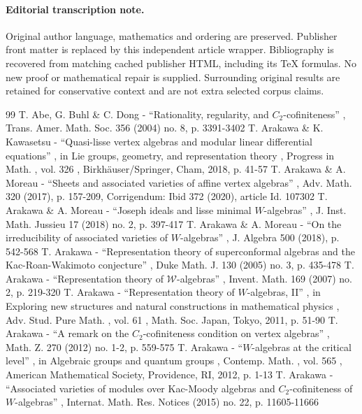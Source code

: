 \documentclass[11pt]{article}
\numberwithin{equation}{section}
\begin{document}
\paragraph{Editorial transcription note.}
Original author language, mathematics and ordering are preserved. Publisher front matter is replaced by this independent article wrapper. Bibliography is recovered from matching cached publisher HTML, including its TeX formulas. No new proof or mathematical repair is supplied. Surrounding original results are retained for conservative context and are not extra selected corpus claims.
\clearpage

\begin{thebibliography}{99}
 T. Abe, G. Buhl \& C. Dong - “Rationality, regularity, and $C_2$-cofiniteness” , Trans. Amer. Math. Soc. 356 (2004) no. 8, p. 3391-3402
 T. Arakawa \& K. Kawasetsu - “Quasi-lisse vertex algebras and modular linear differential equations” , in Lie groups, geometry, and representation theory , Progress in Math. , vol. 326 , Birkhäuser/Springer, Cham, 2018, p. 41-57
 T. Arakawa \& A. Moreau - “Sheets and associated varieties of affine vertex algebras” , Adv. Math. 320 (2017), p. 157-209, Corrigendum: Ibid 372 (2020), article Id. 107302
 T. Arakawa \& A. Moreau - “Joseph ideals and lisse minimal $W$-algebras” , J. Inst. Math. Jussieu 17 (2018) no. 2, p. 397-417
 T. Arakawa \& A. Moreau - “On the irreducibility of associated varieties of $W$-algebras” , J. Algebra 500 (2018), p. 542-568
 T. Arakawa - “Representation theory of superconformal algebras and the Kac-Roan-Wakimoto conjecture” , Duke Math. J. 130 (2005) no. 3, p. 435-478
 T. Arakawa - “Representation theory of $\mathscr{W}$-algebras” , Invent. Math. 169 (2007) no. 2, p. 219-320
 T. Arakawa - “Representation theory of $W$-algebras, II” , in Exploring new structures and natural constructions in mathematical physics , Adv. Stud. Pure Math. , vol. 61 , Math. Soc. Japan, Tokyo, 2011, p. 51-90
 T. Arakawa - “A remark on the $C_2$-cofiniteness condition on vertex algebras” , Math. Z. 270 (2012) no. 1-2, p. 559-575
 T. Arakawa - “$W$-algebras at the critical level” , in Algebraic groups and quantum groups , Contemp. Math. , vol. 565 , American Mathematical Society, Providence, RI, 2012, p. 1-13
 T. Arakawa - “Associated varieties of modules over Kac-Moody algebras and $C_2$-cofiniteness of $W$-algebras” , Internat. Math. Res. Notices (2015) no. 22, p. 11605-11666

\end{thebibliography}
\end{document}
